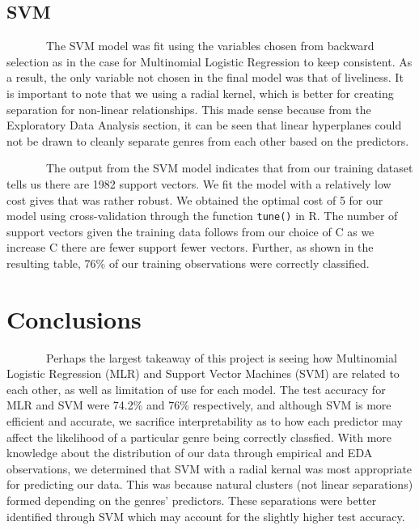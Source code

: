 \documentclass[
]{article}
\begin{document}
\hypertarget{svm}{%
\subsection{SVM}\label{svm}}

~~~~~~~The SVM model was fit using the variables chosen from backward
selection as in the case for Multinomial Logistic Regression to keep
consistent. As a result, the only variable not chosen in the final model
was that of liveliness. It is important to note that we using a radial
kernel, which is better for creating separation for non-linear
relationships. This made sense because from the Exploratory Data
Analysis section, it can be seen that linear hyperplanes could not be
drawn to cleanly separate genres from each other based on the
predictors.

~~~~~~~The output from the SVM model indicates that from our training
dataset tells us there are 1982 support vectors. We fit the model with a
relatively low cost gives that was rather robust. We obtained the
optimal cost of 5 for our model using cross-validation through the
function \texttt{tune()} in R. The number of support vectors given the
training data follows from our choice of C as we increase C there are
fewer support fewer vectors. Further, as shown in the resulting table,
76\% of our training observations were correctly classified.

\hypertarget{conclusions}{%
\section{Conclusions}\label{conclusions}}

~~~~~~~Perhaps the largest takeaway of this project is seeing how
Multinomial Logistic Regression (MLR) and Support Vector Machines (SVM)
are related to each other, as well as limitation of use for each model.
The test accuracy for MLR and SVM were 74.2\% and 76\% respectively, and
although SVM is more efficient and accurate, we sacrifice
interpretability as to how each predictor may affect the likelihood of a
particular genre being correctly classfied. With more knowledge about
the distribution of our data through empirical and EDA observations, we
determined that SVM with a radial kernal was most appropriate for
predicting our data. This was because natural clusters (not linear
separations) formed depending on the genres' predictors. These
separations were better identified through SVM which may account for the
slightly higher test accuracy.
\end{document}
